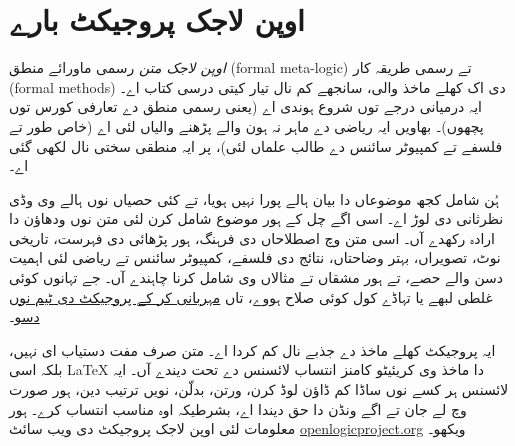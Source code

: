 \chapter*{اوپن لاجک پروجیکٹ بارے}


\textit{اوپن لاجک متن} رسمی ماورائے منطق (formal meta-logic) تے رسمی طریقہ کار
(formal methods) دی اک کھلے ماخذ والی، سانجھے کم نال تیار کیتی درسی کتاب اے۔ ایہ درمیانی درجے توں شروع
ہوندی اے (یعنی رسمی منطق دے تعارفی کورس توں پچھوں)۔ بھاویں ایہ ریاضی
دے ماہر نہ ہون والے پڑھنے والیاں لئی اے (خاص طور تے فلسفے تے کمپیوٹر
سائنس دے طالب علماں لئی)، پر ایہ منطقی سختی نال لکھی گئی اے۔

ہُن شامل کجھ موضوعاں دا بیان ہالے پورا نہیں ہویا، تے کئی حصیاں نوں ہالے
وی وڈی نظرثانی دی لوڑ اے۔ اسی اگے چل کے ہور موضوع شامل کرن لئی متن
نوں ودھاؤن دا ارادہ رکھدے آں۔ اسی متن وچ اصطلاحاں دی فرہنگ، ہور پڑھائی
دی فہرست، تاریخی نوٹ، تصویراں، بہتر وضاحتاں، نتائج دی فلسفے، کمپیوٹر
سائنس تے ریاضی لئی اہمیت دسن والے حصے، تے ہور مشقاں تے مثالاں وی
شامل کرنا چاہندے آں۔ جے تہانوں کوئی غلطی لبھے یا تہاڈے کول کوئی صلاح ہووے،
تاں \href{https://github.com/OpenLogicProject/OpenLogic/wiki/Contributing}{مہربانی کر کے پروجیکٹ دی ٹیم نوں دسو}۔

ایہ پروجیکٹ کھلے ماخذ دے جذبے نال کم کردا اے۔ متن صرف مفت دستیاب ای
نہیں، بلکہ اسی LaTeX دا ماخذ وی کریئیٹو کامنز انتساب لائسنس دے تحت
دیندے آں۔ ایہ لائسنس ہر کسے نوں ساڈا کم ڈاؤن لوڈ کرن، ورتن، بدلّن،
نویں ترتیب دین، ہور صورت وچ لے جان تے اگے ونڈن دا حق دیندا اے، بشرطیکہ
اوہ مناسب انتساب کرے۔ ہور معلومات لئی اوپن لاجک پروجیکٹ دی ویب سائٹ
\href{http://openlogicproject.org/}{openlogicproject.org} ویکھو۔
